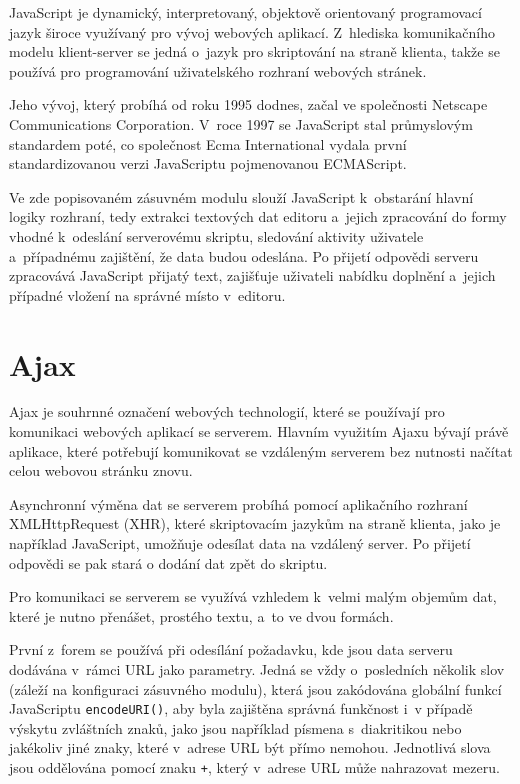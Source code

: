 \documentclass[a4paper,11pt,openany]{book} %
\begin{document}
JavaScript je dynamický, interpretovaný, objektově orientovaný programovací jazyk široce využívaný pro vývoj webových aplikací. Z~hlediska komunikačního modelu klient-server se jedná o~jazyk pro skriptování na straně klienta, takže se používá pro programování uživatelského rozhraní webových stránek. \parencite[2--4]{flanagan2006javascript} %


Jeho vývoj, který probíhá od roku 1995 dodnes, začal ve společnosti Netscape Communications Corporation. V~roce 1997 se JavaScript stal průmyslovým standardem poté, co společnost Ecma International vydala první standardizovanou verzi JavaScriptu pojmenovanou ECMAScript. \parencite{brendaneich2011} %

Ve zde popisovaném zásuvném modulu slouží JavaScript k~obstarání hlavní logiky rozhraní, tedy extrakci textových dat editoru a~jejich zpracování do formy vhodné k~odeslání serverovému skriptu, sledování aktivity uživatele a~případnému zajištění, že data budou odeslána. Po přijetí odpovědi serveru zpracovává JavaScript přijatý text, zajišťuje uživateli nabídku doplnění a~jejich případné vložení na správné místo v~editoru. 

\section{Ajax}

Ajax je souhrnné označení webových technologií, které se používají pro komunikaci webových aplikací se serverem. Hlavním využitím Ajaxu bývají právě aplikace, které potřebují komunikovat se vzdáleným serverem bez nutnosti načítat celou webovou stránku znovu. \parencite{garrett2005ajax}

Asynchronní výměna dat se serverem probíhá pomocí aplikačního rozhraní XMLHttpRequest (XHR), které skriptovacím jazykům na straně klienta, jako je například JavaScript, umožňuje odesílat data na vzdálený server. Po přijetí odpovědi se pak stará o dodání dat zpět do skriptu.

Pro komunikaci se serverem se využívá vzhledem k~velmi malým objemům dat, které je nutno přenášet, prostého textu, a~to ve dvou formách. 

První z~forem se používá při odesílání požadavku, kde jsou data serveru dodávána v~rámci URL jako parametry. Jedná se vždy o~posledních několik slov (záleží na konfiguraci zásuvného modulu), která jsou zakódována globální funkcí JavaScriptu {\tt encodeURI()}, aby byla zajištěna správná funkčnost i~v případě výskytu zvláštních znaků, jako jsou například písmena s~diakritikou nebo jakékoliv jiné znaky, které v~adrese URL být přímo nemohou. Jednotlivá slova jsou oddělována pomocí znaku {\tt +}, který v~adrese URL může nahrazovat mezeru.
\end{document}
